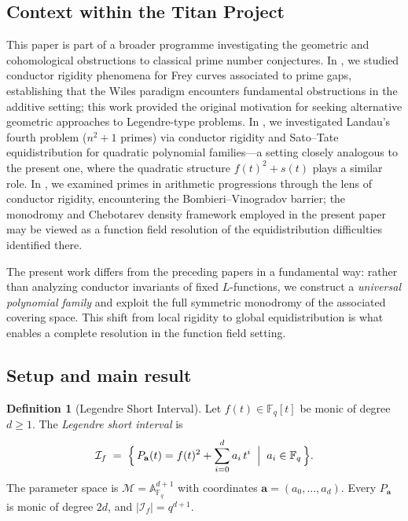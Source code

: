\documentclass[11pt, a4paper]{article}
\theoremstyle{definition}
\newtheorem{definition}[theorem]{Definition}
\theoremstyle{remark}
\newcommand{\Fq}{\mathbb{F}_q}
\newcommand{\Affine}{\mathbb{A}}
\begin{document}
\subsection{Context within the Titan Project}

This paper is part of a broader programme investigating the
geometric and cohomological obstructions to classical prime
number conjectures.
In \cite{ChenConductor}, we studied conductor rigidity phenomena
for Frey curves associated to prime gaps,
establishing that the Wiles paradigm encounters fundamental
obstructions in the additive setting;
this work provided the original motivation for seeking
alternative geometric approaches to Legendre-type problems.
In \cite{ChenLandau}, we investigated Landau's fourth problem
($n^2 + 1$ primes) via conductor rigidity and Sato--Tate
equidistribution for quadratic polynomial families---a setting
closely analogous to the present one, where the quadratic
structure $f(t)^2 + s(t)$ plays a similar role.
In \cite{ChenAP}, we examined primes in arithmetic progressions
through the lens of conductor rigidity,
encountering the Bombieri--Vinogradov barrier;
the monodromy and Chebotarev density framework employed in the
present paper may be viewed as a function field resolution of
the equidistribution difficulties identified there.

The present work differs from the preceding papers in a fundamental
way: rather than analyzing conductor invariants of fixed
$L$-functions, we construct a \emph{universal polynomial family}
and exploit the full symmetric monodromy of the associated covering
space.
This shift from local rigidity to global equidistribution is what
enables a complete resolution in the function field setting.

\subsection{Setup and main result}

\begin{definition}[Legendre Short Interval]\label{def:interval}
Let $f(t) \in \Fq[t]$ be monic of degree $d \ge 1$.
The \emph{Legendre short interval} is
\[
    \mathcal{I}_f
    \;=\;
    \Bigl\{\,
    P_\mathbf{a}(t) = f(t)^2 + \sum_{i=0}^d a_i\, t^i
    \;\Bigm|\; a_i \in \Fq
    \,\Bigr\}.
\]
The parameter space is $\mathcal{M} = \Affine^{d+1}_{\Fq}$
with coordinates $\mathbf{a}=(a_0,\dots,a_d)$.
Every $P_\mathbf{a}$ is monic of degree $2d$, and
$|\mathcal{I}_f| = q^{d+1}$.
\end{definition}
\end{document}
